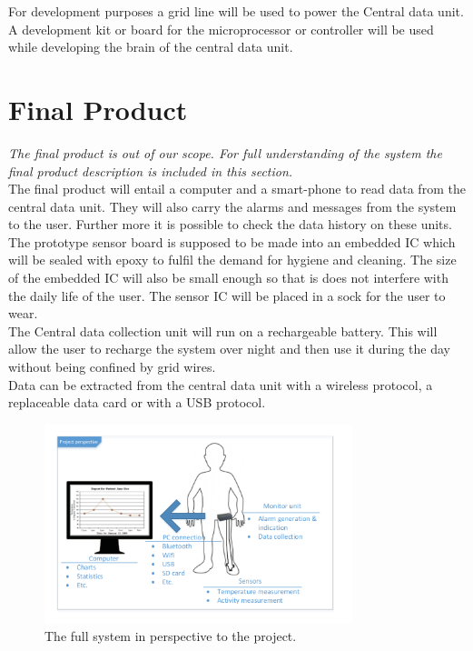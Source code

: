For development purposes a grid line will be used to power the Central data unit. A development kit or board for the microprocessor or controller  will be used while developing the brain of the central data unit. \\

\section{Final Product}
\textit{The final product is out of our scope. For full understanding of the system the final product description is included in this section.}\\

The final product will entail a computer and a smart-phone to read data from the central data unit. They will also carry the alarms and messages from the system to the user. Further more it is possible to check the data history on these units. \\

The prototype sensor board is supposed to be made into an embedded IC which will be sealed with epoxy to fulfil the demand for hygiene and cleaning. The size of the embedded IC will also be small enough so that is does not interfere with the daily life of the user. The sensor IC will be placed in a sock for the user to wear. \\

The Central data collection unit will run on a rechargeable battery. This will allow the user to recharge the system over night and then use it during the day without being confined by grid wires.\\

Data can be extracted from the central data unit with a wireless protocol, a replaceable data card or with a USB protocol.
\begin{figure}[H]
\centering
\includegraphics[width=0.8\textwidth]{billeder/fullsystem_vector}
\caption{The full system in perspective to the project.}
\end{figure}
